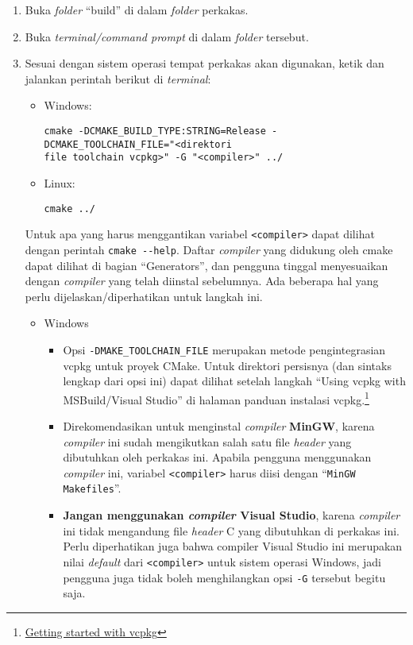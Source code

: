 \begin{enumerate}
	\item Buka \textit{folder} ``build'' di dalam \textit{folder} perkakas.
	\item Buka \textit{terminal/command prompt} di dalam \textit{folder} tersebut.
	\item Sesuai dengan sistem operasi tempat perkakas akan digunakan, ketik dan jalankan perintah berikut di \textit{terminal}:
	
	\begin{itemize}
		\item Windows:
		\begin{verbatim}
cmake -DCMAKE_BUILD_TYPE:STRING=Release -DCMAKE_TOOLCHAIN_FILE="<direktori
file toolchain vcpkg>" -G "<compiler>" ../
		\end{verbatim}
	
		\item Linux:
		\begin{verbatim}
cmake ../
		\end{verbatim}
	\end{itemize}		

	Untuk apa yang harus menggantikan variabel \verb|<compiler>| dapat dilihat dengan perintah \verb|cmake --help|. Daftar \textit{compiler} yang didukung oleh cmake dapat dilihat di bagian \mbox{``Generators''}, dan pengguna tinggal menyesuaikan dengan \textit{compiler} yang telah diinstal sebelumnya.  Ada beberapa hal yang perlu dijelaskan/diperhatikan untuk langkah ini.
	
	\begin{itemize}
		\item Windows
			
		\begin{itemize}
			\item Opsi \verb|-DMAKE_TOOLCHAIN_FILE| merupakan metode pengintegrasian vcpkg untuk proyek CMake. Untuk direktori persisnya (dan sintaks lengkap dari opsi ini) dapat dilihat setelah langkah ``Using vcpkg with MSBuild/Visual Studio'' di halaman panduan instalasi vcpkg.\footnote{\href{https://vcpkg.io/en/getting-started.html}{Getting started with vcpkg}}
			\item Direkomendasikan untuk menginstal \textit{compiler} \textbf{MinGW}, karena \textit{compiler} ini sudah mengikutkan salah satu file \textit{header} yang dibutuhkan oleh perkakas ini. Apabila pengguna menggunakan \textit{compiler} ini, variabel \verb|<compiler>| harus diisi dengan ``\verb|MinGW Makefiles|''.
			\item \textbf{Jangan menggunakan \textit{compiler} Visual Studio}, karena \textit{compiler} ini tidak mengandung file \textit{header} C yang dibutuhkan di perkakas ini. Perlu diperhatikan juga bahwa compiler Visual Studio ini merupakan nilai \textit{default} dari \verb|<compiler>| untuk sistem operasi Windows, jadi pengguna juga tidak boleh menghilangkan opsi \verb|-G| tersebut begitu saja.
		\end{itemize}
			

\end{itemize}
\end{enumerate}
